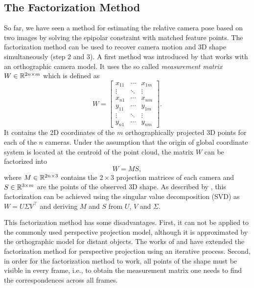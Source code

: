 			
	\subsection{The Factorization Method}
		So far, we have seen a method for estimating the relative camera pose based on two images by solving the epipolar constraint with matched feature points.
		The factorization method can be used to recover camera motion and 3D shape simultaneously (step 2 and 3).
		A first method was introduced by \cite{tomasi1992factorization} that works with an orthographic camera model.
		It uses the so called \emph{measurement matrix} $W \in \mathbb{R}^{2n \times m}$ which is defined as
		\begin{equation}\label{eq:measurement_matrix}
			W =
			\begin{bmatrix}
				x_{11} & \cdots & x_{1m} \\ 
				\vdots & \ddots & \vdots \\ 
				x_{n1} & \cdots & x_{nm} \\ 
				y_{11} & \cdots & y_{1m} \\ 
				\vdots & \ddots & \vdots \\ 
				y_{n1} & \cdots & y_{nm}
			\end{bmatrix}. 
		\end{equation}
		It contains the 2D coordinates of the $m$ orthographically projected 3D points for each of the $n$ cameras.
		Under the assumption that the origin of global coordinate system is located at the centroid of the point cloud, the matrix $W$ can be factorized into
		\begin{equation}\label{eq:factorization_method}
			W = MS,
		\end{equation}
		where $M \in \mathbb{R}^{2n \times 3}$ contains the $2 \times 3$ projection matrices of each camera and $S \in \mathbb{R}^{3 \times m}$  are the points of the observed 3D shape.
		As described by \cite{tomasi1992factorization}, this factorization can be achieved using the singular value decomposition (SVD) as $W = U \varSigma V^\top$ and deriving $M$ and $S$ from $U$, $V$ and $\varSigma$.
		
		This factorization method has some disadvantages.
		First, it can not be applied to the commonly used perspective projection model, although it is approximated by the orthographic model for distant objects.
		The works of \cite{sturm1996factorization} and \cite{christy1996euclidean} have extended the factorization method for perspective projection using an iterative process.
		Second, in order for the factorization method to work, all points of the shape must be visible in every frame, i.e., to obtain the measurement matrix one needs to find the correspondences across all frames.
		
